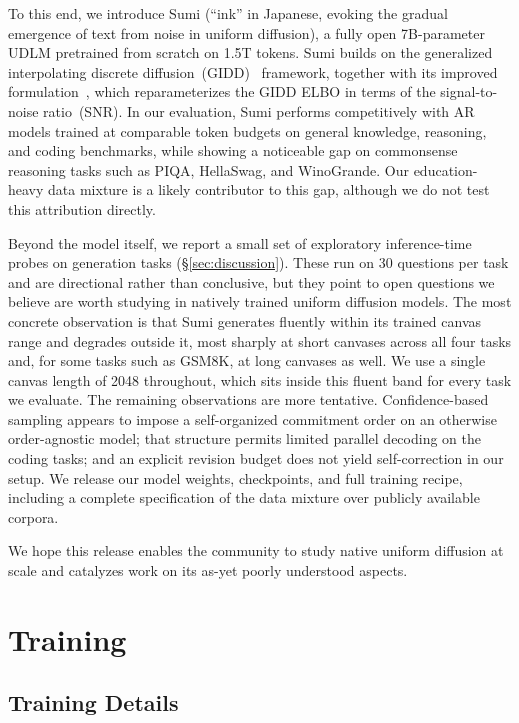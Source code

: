 \documentclass[11pt, a4paper]{style}
\begin{document}
To this end, we introduce Sumi (``ink'' in Japanese, evoking the gradual emergence of text from noise in uniform diffusion), a fully open 7B-parameter UDLM pretrained from scratch on 1.5T tokens. 
Sumi builds on the generalized interpolating discrete diffusion~(GIDD)~\citep{rutte2025gidd} framework, together with its improved formulation~\citep{rutte2026scaling}, which reparameterizes the GIDD ELBO in terms of the signal-to-noise ratio~(SNR).
In our evaluation, Sumi performs competitively with AR models trained at comparable token budgets on general knowledge, reasoning, and coding benchmarks, while showing a noticeable gap on commonsense reasoning tasks such as PIQA, HellaSwag, and WinoGrande. Our education-heavy data mixture is a likely contributor to this gap, although we do not test this attribution directly.

Beyond the model itself, we report a small set of exploratory inference-time probes on generation tasks (\S\ref{sec:discussion}).
These run on 30 questions per task and are directional rather than conclusive, but they point to open questions we believe are worth studying in natively trained uniform diffusion models.
The most concrete observation is that Sumi generates fluently within its trained canvas range and degrades outside it, most sharply at short canvases across all four tasks and, for some tasks such as GSM8K, at long canvases as well. We use a single canvas length of 2048 throughout, which sits inside this fluent band for every task we evaluate.
The remaining observations are more tentative. Confidence-based sampling appears to impose a self-organized commitment order on an otherwise order-agnostic model; that structure permits limited parallel decoding on the coding tasks; and an explicit revision budget does not yield self-correction in our setup.
We release our model weights, checkpoints, and full training recipe, including a complete specification of the data mixture over publicly available corpora.

We hope this release enables the community to study native uniform diffusion at scale and catalyzes work on its as-yet poorly understood aspects.






\section{Training}
\subsection{Training Details}
\end{document}
